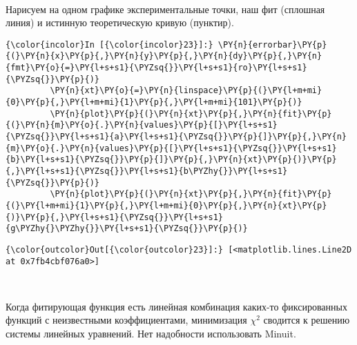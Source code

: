     \begin{center}
    \end{center}
    { \hspace*{\fill} \\}
    
    Нарисуем на одном графике экспериментальные точки, наш фит (сплошная
линия) и истинную теоретическую кривую (пунктир).

    \begin{Verbatim}[commandchars=\\\{\}]
{\color{incolor}In [{\color{incolor}23}]:} \PY{n}{errorbar}\PY{p}{(}\PY{n}{x}\PY{p}{,}\PY{n}{y}\PY{p}{,}\PY{n}{dy}\PY{p}{,}\PY{n}{fmt}\PY{o}{=}\PY{l+s+s1}{\PYZsq{}}\PY{l+s+s1}{ro}\PY{l+s+s1}{\PYZsq{}}\PY{p}{)}
         \PY{n}{xt}\PY{o}{=}\PY{n}{linspace}\PY{p}{(}\PY{l+m+mi}{0}\PY{p}{,}\PY{l+m+mi}{1}\PY{p}{,}\PY{l+m+mi}{101}\PY{p}{)}
         \PY{n}{plot}\PY{p}{(}\PY{n}{xt}\PY{p}{,}\PY{n}{fit}\PY{p}{(}\PY{n}{m}\PY{o}{.}\PY{n}{values}\PY{p}{[}\PY{l+s+s1}{\PYZsq{}}\PY{l+s+s1}{a}\PY{l+s+s1}{\PYZsq{}}\PY{p}{]}\PY{p}{,}\PY{n}{m}\PY{o}{.}\PY{n}{values}\PY{p}{[}\PY{l+s+s1}{\PYZsq{}}\PY{l+s+s1}{b}\PY{l+s+s1}{\PYZsq{}}\PY{p}{]}\PY{p}{,}\PY{n}{xt}\PY{p}{)}\PY{p}{,}\PY{l+s+s1}{\PYZsq{}}\PY{l+s+s1}{b\PYZhy{}}\PY{l+s+s1}{\PYZsq{}}\PY{p}{)}
         \PY{n}{plot}\PY{p}{(}\PY{n}{xt}\PY{p}{,}\PY{n}{fit}\PY{p}{(}\PY{l+m+mi}{1}\PY{p}{,}\PY{l+m+mi}{0}\PY{p}{,}\PY{n}{xt}\PY{p}{)}\PY{p}{,}\PY{l+s+s1}{\PYZsq{}}\PY{l+s+s1}{g\PYZhy{}\PYZhy{}}\PY{l+s+s1}{\PYZsq{}}\PY{p}{)}
\end{Verbatim}


\begin{Verbatim}[commandchars=\\\{\}]
{\color{outcolor}Out[{\color{outcolor}23}]:} [<matplotlib.lines.Line2D at 0x7fb4cbf076a0>]
\end{Verbatim}
            
    \begin{center}
    \end{center}
    { \hspace*{\fill} \\}
    
    Когда фитирующая функция есть линейная комбинация каких-то фиксированных
функций с неизвестными коэффициентами, минимизация \(\chi^2\) сводится к
решению системы линейных уравнений. Нет надобности использовать Minuit.

